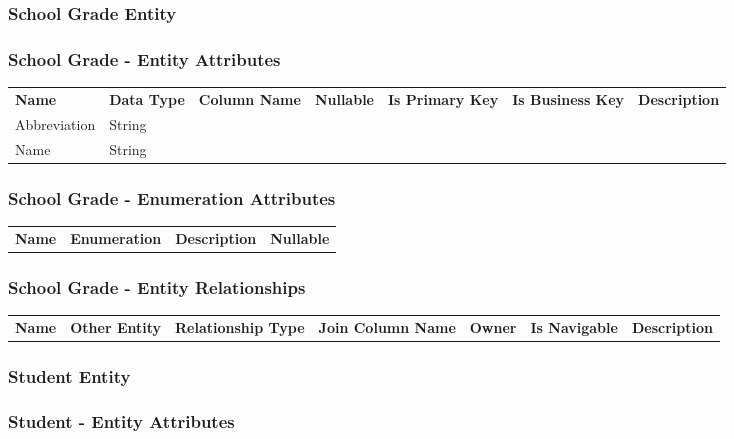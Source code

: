 \subsubsection{ School Grade Entity }

\subsubsection*{ School Grade - Entity Attributes }

\begin{tabular}{lllcccl}
\bfseries Name & \bfseries Data Type & \bfseries Column Name & \bfseries Nullable & \bfseries Is Primary Key & \bfseries Is Business Key & \bfseries Description\\
Abbreviation & String &  &  &  &  &  \\
Name & String &  &  &  &  &  \\
\end{tabular}

\subsubsection*{ School Grade - Enumeration Attributes}

\begin{tabular}{lcp{6.0cm}c}
\bfseries Name & \bfseries Enumeration & \bfseries Description & \bfseries Nullable \\
\end{tabular}

\subsubsection*{ School Grade - Entity Relationships}

\begin{tabular}{llllllp{2.0cm}}
\bfseries Name & \bfseries Other Entity & \bfseries Relationship Type & \bfseries Join Column Name & \bfseries Owner & \bfseries Is Navigable & \bfseries Description\\
\end{tabular}


\subsubsection{ Student Entity }

\subsubsection*{ Student - Entity Attributes }

